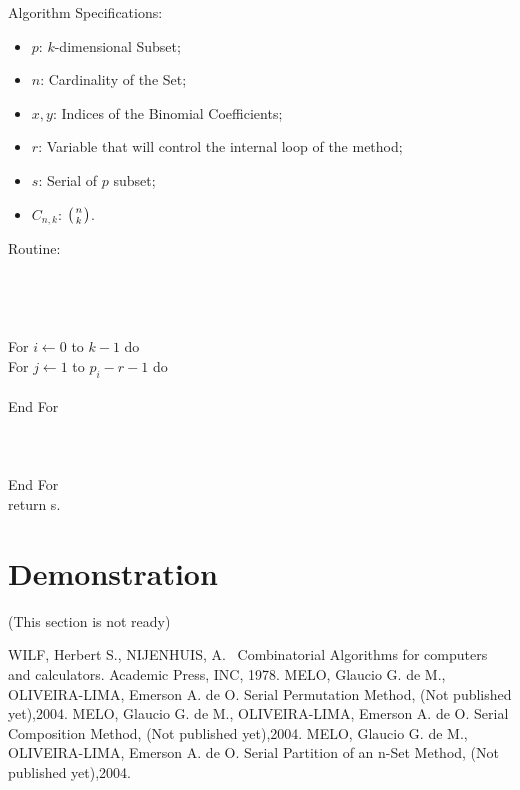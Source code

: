 \documentclass {amsart}
\begin{document}
Algorithm Specifications:
\begin{itemize}
\item {$p$}: {$k$}-dimensional Subset;

\item {$n$}: Cardinality of the Set;

\item {$x,y$}: Indices of the Binomial Coefficients;

\item {$r$}: Variable that will control the internal loop of the
method;

\item {$s$}: Serial of {$p$} subset;

\item {$C_{n,k}$}: {$\big({n\atop k}\big)$}.

\end{itemize}
Routine:\\
\\
\\
\\
\\
\indent For {$i \leftarrow 0$} to {$k-1$} do \\
\indent \indent For {$j \leftarrow 1$} to {$p_i - r - 1$} do\\
\indent \indent {}\\
\indent \indent End For\\
\indent {}\\
\indent {}\\
\indent {}\\
\indent End For\\
return s.

\section*{Demonstration}
(This section is not ready)

\begin{thebibliography}{99}
 WILF, Herbert S., NIJENHUIS, A.
~Combinatorial Algorithms for computers and calculators. Academic
Press, INC, 1978.
 MELO, Glaucio G. de M., OLIVEIRA-LIMA, Emerson A. de O. Serial Permutation Method,
(Not published yet),2004.
 MELO, Glaucio G. de M., OLIVEIRA-LIMA, Emerson A. de O. Serial Composition Method,
(Not published yet),2004.
 MELO, Glaucio G. de M., OLIVEIRA-LIMA, Emerson A. de O. Serial Partition of an n-Set Method,
(Not published yet),2004.
\end{thebibliography}
\end{document}
